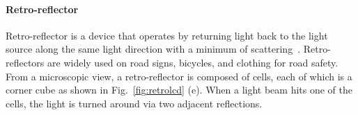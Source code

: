 






\paragraph{Retro-reflector} 
Retro-reflector is a device that operates by returning light back to the light source along the same light direction with a minimum of scattering~\cite{rr}. Retro-reflectors are widely used on road signs, bicycles, and clothing for road safety. From a microscopic view, a retro-reflector is composed of cells, each of which is a corner cube as shown in Fig.~\ref{fig:retrolcd} (e). When a light beam hits one of the cells, the light is turned around via two adjacent reflections. 




